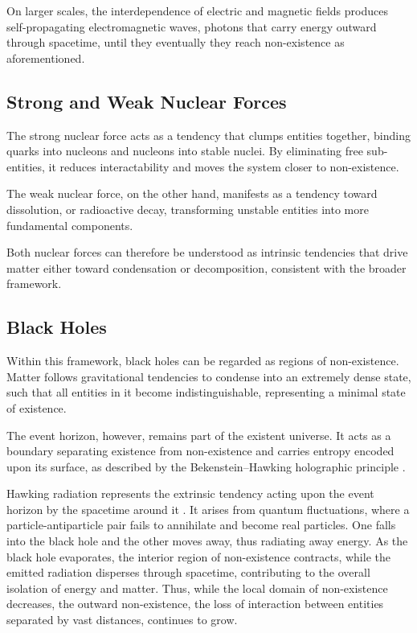 \documentclass{article}
\begin{document}
On larger scales, the interdependence of electric and magnetic fields produces self-propagating electromagnetic waves, photons that carry energy outward through spacetime, until they eventually they reach non-existence as aforementioned.


\subsection{Strong and Weak Nuclear Forces}

The strong nuclear force acts as a tendency that clumps entities together, binding quarks into nucleons and nucleons into stable nuclei. 
By eliminating free sub-entities, it reduces interactability and moves the system closer to non-existence. 

The weak nuclear force, on the other hand, manifests as a tendency toward dissolution, or radioactive decay, transforming unstable entities into more fundamental components.  

Both nuclear forces can therefore be understood as intrinsic tendencies that drive matter either toward condensation or decomposition, consistent with the broader framework.


\subsection{Black Holes}

Within this framework, black holes can be regarded as regions of non-existence. 
Matter follows gravitational tendencies to condense into an extremely dense state, such that all entities in it become indistinguishable, representing a minimal state of existence. 

The event horizon, however, remains part of the existent universe. 
It acts as a boundary separating existence from non-existence and carries entropy encoded upon its surface, as described by the Bekenstein–Hawking holographic principle \cite{ferrari2025bekensteinhawkingentropybriefoverview}.

Hawking radiation represents the extrinsic tendency acting upon the event horizon by the spacetime around it \cite{HawkingRadiation2005}.
It arises from quantum fluctuations, where a particle-antiparticle pair fails to annihilate and become real particles. One falls into the black hole and the other moves away, thus radiating away energy.
As the black hole evaporates, the interior region of non-existence contracts, while the emitted radiation disperses through spacetime, contributing to the overall isolation of energy and matter. 
Thus, while the local domain of non-existence decreases, the outward non-existence, the loss of interaction between entities separated by vast distances, continues to grow.
\end{document}
